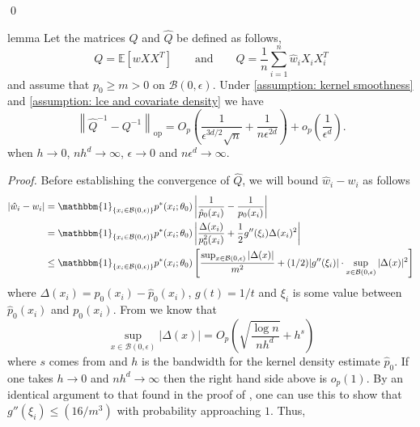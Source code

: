 \documentclass[11pt]{article}
\begin{document}
\qed{}

\begin{restatable}{lemma}{}
    Let the matrices $Q$ and $\hat{Q}$ be defined as follows, 
    \begin{equation}
    Q = \mathbb{E}\left[wXX^T\right] \qquad \text{and} \qquad \hat{Q} = \frac{1}{n}\sum_{i = 1}^n\hat{w}_iX_iX_i^T
    \end{equation}
    and assume that $p_0 \geq m > 0$ on $\mathcal{B}(0, \epsilon)$. Under \cref{assumption: kernel smoothness} and \cref{assumption: lce and covariate density} we have 
    \[\left\|\hat{Q}^{-1} - Q^{-1}\right\|_{\text{op}} = O_p\left(\frac{1}{\epsilon^{3d/2}\sqrt{n}} + \frac{1}{n\epsilon^{2d}}\right) + o_p\left(\frac{1}{\epsilon^d}\right).\]
    when $h \rightarrow 0$, $nh^d \rightarrow \infty$, $\epsilon \rightarrow 0$ and $n\epsilon^d \rightarrow \infty$. 
    \label{lemma: Q convergence}
\end{restatable}
\noindent \textit{Proof.} Before establishing the convergence of $\hat{Q}$, we will bound $\hat{w}_i - w_i$ as follows
\begin{align*}
    |\hat{w}_i - w_i| &= \mathbbm{1}_{\{x_i \in \mathcal{B}(0, \epsilon)\}}p^*(x_i;\theta_0) \left|\frac{1}{\hat{p}_0(x_i)} - \frac{1}{p_0(x_i)}\right| \\
    &=  \mathbbm{1}_{\{x_i \in \mathcal{B}(0, \epsilon)\}}p^*(x_i;\theta_0) \left|\frac{\Delta(x_i)}{p^2_0(x_i)} + \frac{1}{2}g''(\xi_i)\Delta(x_i)^2\right| \\
    &\leq \mathbbm{1}_{\{x_i \in \mathcal{B}(0, \epsilon)\}}p^*(x_i;\theta_0) \left[\frac{ \sup_{x \in \mathcal{B}(0, \epsilon)}|\Delta(x)|}{m^2} + (1/2)|g''(\xi_i)|\cdot \sup_{x \in \mathcal{B}(0, \epsilon)}|\Delta(x)|^2\right]
\end{align*}
where $\Delta(x_i) = p_0(x_i) - \hat{p}_0(x_i)$, $g(t) = 1/t$ and $\xi_i$ is some value between $\hat{p}_0(x_i)$ and $p_0(x_i)$. From  we know that 
\begin{equation}
    \sup_{x \in \mathcal{B}(0, \epsilon)} |\Delta(x)| = O_p\left(\sqrt{\frac{\log n}{nh^d}} + h^s\right)
\end{equation}
where $s$ comes from  and $h$ is the bandwidth for the kernel density estimate $\hat{p}_0$. If one takes $h \rightarrow 0$ and $nh^d \rightarrow \infty$ then the right hand side above is $o_p(1)$. By an identical argument to that found in the proof of , one can use this to show that $g''(\xi_i) \leq (16/m^3)$ with probability approaching $1$. Thus,
\end{document}
